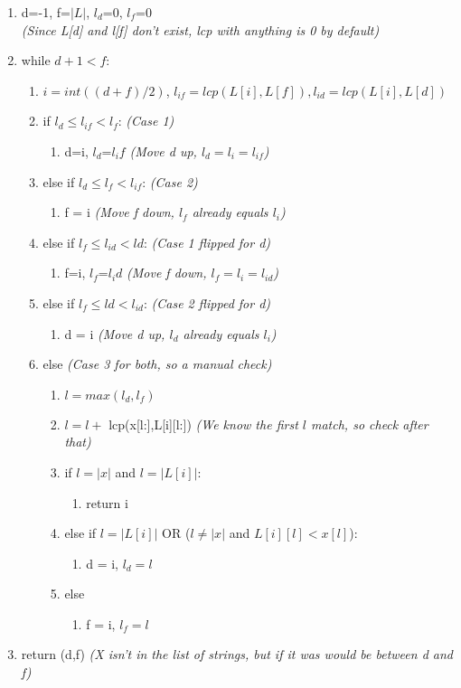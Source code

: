 \begin{enumerate}[label=\Alph*]
    \item d=-1, f=$|L|$, $l_d$=0, $l_f$=0 \\ \emph{(Since L[d] and l[f] don't exist, lcp with anything is 0 by default)}
    \item while $d+1<f$:
\begin{enumerate}[label=\arabic*]
    \item \(i = int((d+f)/2)\), \( l_{if} = lcp(L[i],L[f]), l_{id} = lcp(L[i],L[d])  \)
    \item if \(l_d \leq l_{if} < l_f\): \emph{(Case 1)}
 \begin{enumerate}
    \item [] d=i, $l_d$=$l_if$ \emph{(Move d up, $l_d=l_i=l_{if}$)}
\end{enumerate} 
    \item [] else if \(l_d \leq l_f < l_{if}\): \emph{(Case 2)}
 \begin{enumerate}
    \item [] f = i \emph{(Move f down, $l_f$ already equals $l_i$)}
\end{enumerate} 
    \item [] else if \(l_f \leq l_{id} < ld\): \emph{(Case 1 flipped for d)}
 \begin{enumerate}
    \item [] f=i, $l_f$=$l_id$ \emph{(Move f down, $l_f=l_i=l_{id}$)}
\end{enumerate} 
    \item [] else if \(l_f \leq ld < l_{id}\): \emph{(Case 2 flipped for d)}
 \begin{enumerate}
    \item [] d = i \emph{(Move d up, $l_d$ already equals $l_i$)}
\end{enumerate} 
    \item [] else \emph{(Case 3 for both, so a manual check)}
 \begin{enumerate}
    \item $l = max(l_d,l_f)$ 
    \item $l = l +$ lcp(x[l:],L[i][l:]) \emph{(We know the first $l$ match, so check after that)}
    \item if $l= |x|$ and $l= |L[i]|$:
 \begin{enumerate}
    \item [] return i 
\end{enumerate} 
    \item [] else if $l= |L[i]|$ OR ($l\neq |x|$ and $L[i][l] < x[l]$):
 \begin{enumerate}
    \item [] d = i, $l_d=l$
\end{enumerate} 
    \item [] else 
 \begin{enumerate}
    \item [] f = i, $l_f=l$ 
\end{enumerate} 
\end{enumerate} 
\end{enumerate}  
\item return (d,f) \emph{(X isn't in the list of strings, but if it was would be between d and f)}
\end{enumerate}